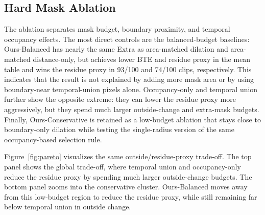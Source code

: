 \documentclass[nouppercase]{kaia}
\begin{document}
\begin{table}[h]
\begin{center}
\end{center}
\caption{External trade-off check on 30 DAVIS 2017 validation clips. DAVIS is not a native object-removal benchmark; the table checks whether the same operating-point behavior appears outside AI-Hub. Ours-Balanced uses $r_b=5$, $r_s=30$, and $\tau=0.15$, matching the representative setting in the main AI-Hub table.}
\label{tab:davis}
\end{table}
\subsection{Hard Mask Ablation}
The ablation separates mask budget, boundary proximity, and temporal occupancy effects. The most direct controls are the balanced-budget baselines: Ours-Balanced has nearly the same Extra as area-matched dilation and area-matched distance-only, but achieves lower BTE and residue proxy in the mean table and wins the residue proxy in 93/100 and 74/100 clips, respectively. This indicates that the result is not explained by adding more mask area or by using boundary-near temporal-union pixels alone. Occupancy-only and temporal union further show the opposite extreme: they can lower the residue proxy more aggressively, but they spend much larger outside-change and extra-mask budgets. Finally, Ours-Conservative is retained as a low-budget ablation that stays close to boundary-only dilation while testing the single-radius version of the same occupancy-based selection rule.

Figure~\ref{fig:pareto} visualizes the same outside/residue-proxy trade-off. The top panel shows the global trade-off, where temporal union and occupancy-only reduce the residue proxy by spending much larger outside-change budgets. The bottom panel zooms into the conservative cluster. Ours-Balanced moves away from this low-budget region to reduce the residue proxy, while still remaining far below temporal union in outside change.
\end{document}
